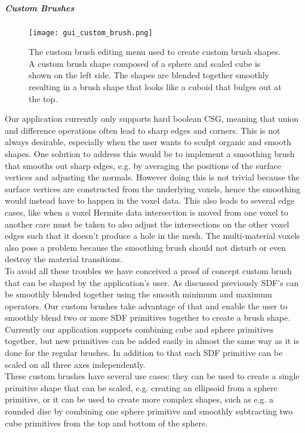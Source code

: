 \subparagraph{Custom Brushes}

\begin{figure}
\centering
\captionsetup{width=0.8\textwidth}
\texttt{[image: gui\_custom\_brush.png]}
\caption{The custom brush editing menu used to create custom brush shapes. A custom brush shape composed of a sphere and scaled cube is shown on the left side. The shapes are blended together smoothly resulting in a brush shape that looks like a cuboid that bulges out at the top.}
\label{fig:gui_custom_brush}
\end{figure}

Our application currently only supports hard boolean CSG, meaning that union and difference operations often lead to sharp edges and corners. This is not always desirable, especially when the user wants to sculpt organic and
smooth shapes. One solution to address this would be to implement a smoothing brush that smooths out sharp edges, e.g. by averaging the positions of the surface vertices and adjusting the normals. However doing this is not trivial
because the surface vertices are constructed from the underlying voxels, hence the smoothing would instead have to happen in the voxel data. This also leads to several edge cases, like when a voxel Hermite data intersection is moved
from one voxel to another care must be taken to also adjust the intersections on the other voxel edges such that it doesn't produce a hole in the mesh. The multi-material voxels also pose a problem because the smoothing brush should
not disturb or even destroy the material transitions.\\
To avoid all these troubles we have conceived a proof of concept custom brush that can be shaped by the application's user. As discussed previously SDF's can be smoothly blended together using the smooth minimum and maximum operators.
Our custom brushes take advantage of that and enable the user to smoothly blend two or more SDF primitives together to create a brush shape. Currently our application supports combining cube and sphere primitives together, but new
primitives can be added easily in almost the same way as it is done for the regular brushes. In addition to that each SDF primitive can be scaled on all three axes independently.\\
These custom brushes have several use cases: they can be used to create a single primitive shape that can be scaled, e.g. creating an ellipsoid from a sphere primitive, or it can be used to create more complex shapes, such as e.g.
a rounded disc by combining one sphere primitive and smoothly subtracting two cube primitives from the top and bottom of the sphere.

